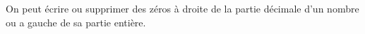 On peut écrire ou supprimer des zéros à droite de la partie décimale d'un
nombre ou a gauche de sa partie entière.
